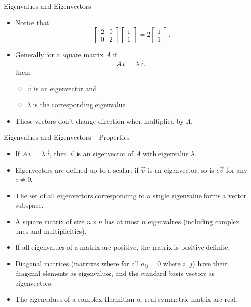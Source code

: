 \documentclass{beamer}
\begin{document}
\begin{frame}{Eigenvalues and Eigenvectors}
  \begin{itemize}
    \item Notice that 
    \begin{equation}
        \begin{bmatrix} 2 & 0 \\ 0 & 2 \end{bmatrix}\begin{bmatrix} 1 \\ 1 \end{bmatrix} = 2\begin{bmatrix} 1 \\ 1 \end{bmatrix}. 
    \end{equation}
    \item Generally for a square matrix \(A\) if
    \begin{equation}
        A\vec{v} = \lambda \vec{v},
    \end{equation}
    then:
    \begin{itemize}
      \item $\vec{v}$ is an eigenvector and
      \item $\lambda$ is the corresponding eigenvalue.
    \end{itemize}
    \item These vectors don't change direction when multiplied by $A$.
  \end{itemize}
\end{frame}

\begin{frame}{Eigenvalues and Eigenvectors – Properties}
  \begin{itemize}
    \item If $A \vec{v} = \lambda \vec{v}$, then $\vec{v}$ is an eigenvector of $A$ with eigenvalue $\lambda$.
    \item Eigenvectors are defined up to a scalar: if $\vec{v}$ is an eigenvector, so is $c\vec{v}$ for any $c \neq 0$.
    \item The set of all eigenvectors corresponding to a single eigenvalue forms a vector subspace.
    \item A square matrix of size $n \times n$ has at most $n$ eigenvalues (including complex ones and multiplicities).
    \item If all eigenvalues of a matrix are positive, the matrix is positive definite.
    \item Diagonal matrices (matrixes where for all $a_{ij}=0$ where $i\neg j$) have their diagonal elements as eigenvalues, and the standard basis vectors as eigenvectors.
    \item The eigenvalues of a complex Hermitian or real symmetric matrix are real.
  \end{itemize}
\end{frame}
\end{document}
